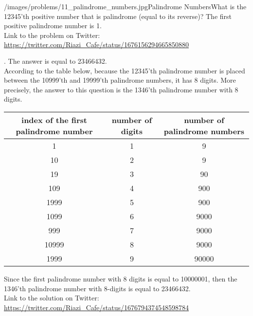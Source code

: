 \begin{problem}{/images/problems/11_palindrome_numbers.jpg}{Palindrome Numbers}What is the 12345'th positive number that is palindrome (equal to its reverse)? The first  positive palindrome number is 1.\\[0.2cm]

Link to the problem on Twitter:  \url{https://twitter.com/Riazi_Cafe/status/1676156294665850880}\end{problem}
\begin{solution}.
The answer is equal to 23466432.\\[0.2cm]

According to the table below, because the 12345'th palindrome number is placed between the 10999'th and 19999'th palindrome numbers, it has 8 digits. More precisely, the answer to this question is the 1346'th palindrome number with 8 digits.

\begin{center}
\begin{tabular}{|c|c|c|}
\hline
 index of the first palindrome number &  number of digits &  number of palindrome numbers \\
\hline
1  & 1 &  9 \\
\hline
10 & 2 & 9 \\
\hline
19 & 3 & 90 \\
\hline
109 & 4 & 900\\
\hline
1999 & 5 & 900\\
\hline
1099 & 6 & 9000\\
\hline
999 & 7 & 9000 \\
\hline
10999 & 8 & 9000\\
\hline
1999 & 9 & 90000\\
\hline
\end{tabular}
\end{center}

Since the first palindrome number with 8 digits is equal to 10000001, then the 1346'th palindrome number with 8-digits is equal to 23466432.\\[0.2cm]

Link to the solution on Twitter:  \url{https://twitter.com/Riazi_Cafe/status/1676794374548598784}\end{solution}
